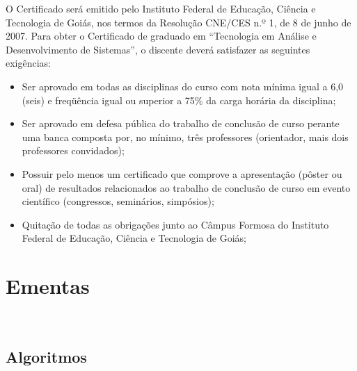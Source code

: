 \documentclass[11pt,fleqn]{book} %
\begin{document}
O Certificado será emitido pelo Instituto Federal de Educação, Ciência e Tecnologia de Goiás, nos termos da Resolução CNE/CES n.º 1, de 8 de junho de 2007.	
Para obter o Certificado de graduado em ``Tecnologia em Análise e Desenvolvimento de Sistemas'', o discente deverá satisfazer as seguintes exigências:
\begin{itemize}
	\item Ser aprovado em todas as disciplinas do curso com nota mínima igual a 6,0 (seis) e freqüência igual ou superior a 75\% da carga horária da disciplina;
	\item Ser aprovado em defesa pública do trabalho de conclusão de curso perante uma banca composta por, no mínimo, três professores (orientador, mais dois professores convidados);
	\item Possuir pelo menos um certificado que comprove a apresentação (pôster ou oral) de resultados relacionados ao trabalho de conclusão de curso em evento científico (congressos, seminários, simpósios);
	\item Quitação de todas as obrigações junto ao Câmpus Formosa do Instituto Federal de Educação, Ciência e Tecnologia de Goiás;
\end{itemize}

\chapter{Ementas}\label{ementas}
\vspace{6em}
\begin{flushright}
	\textit{\textcolor{white}{Um bonita citação...}}
\end{flushright}
\vspace{12em}


\newpage
\section{Algoritmos}\label{disc:algoritmos}
\end{document}
